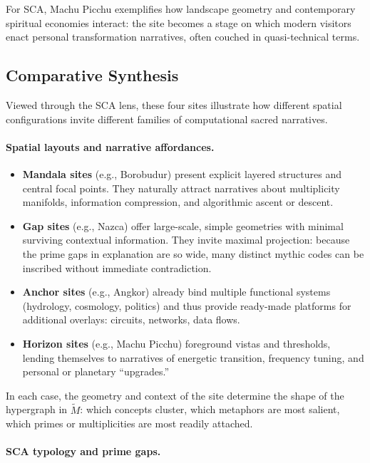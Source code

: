 \documentclass[12]{amsart}
\theoremstyle{plain}
\begin{document}
For SCA, Machu Picchu exemplifies how landscape geometry and contemporary spiritual economies interact: the site becomes a stage on which modern visitors enact personal transformation narratives, often couched in quasi-technical terms.

\subsection{Comparative Synthesis}

Viewed through the SCA lens, these four sites illustrate how different spatial configurations invite different families of computational sacred narratives.

\paragraph{Spatial layouts and narrative affordances.}

\begin{itemize}
  \item \textbf{Mandala sites} (e.g., Borobudur) present explicit layered structures and central focal points. They naturally attract narratives about multiplicity manifolds, information compression, and algorithmic ascent or descent.
  \item \textbf{Gap sites} (e.g., Nazca) offer large-scale, simple geometries with minimal surviving contextual information. They invite maximal projection: because the prime gaps in explanation are so wide, many distinct mythic codes can be inscribed without immediate contradiction.
  \item \textbf{Anchor sites} (e.g., Angkor) already bind multiple functional systems (hydrology, cosmology, politics) and thus provide ready-made platforms for additional overlays: circuits, networks, data flows.
  \item \textbf{Horizon sites} (e.g., Machu Picchu) foreground vistas and thresholds, lending themselves to narratives of energetic transition, frequency tuning, and personal or planetary ``upgrades.''
\end{itemize}

In each case, the geometry and context of the site determine the shape of the hypergraph in $\tilde M$: which concepts cluster, which metaphors are most salient, which primes or multiplicities are most readily attached.

\paragraph{SCA typology and prime gaps.}
\end{document}
